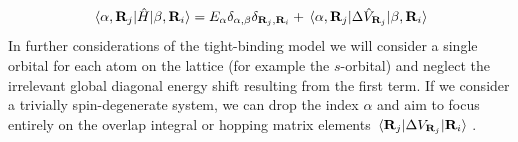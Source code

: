 \documentclass[11pt, a4paper, oneside]{book}
\theoremstyle{definition} %
\begin{document}
\begin{equation}
	\mel{\alpha, \mathbf{R}_j}{\hat{H}}{\beta, \mathbf{R}_i} = E_{\alpha} \delta_{\alpha,\beta} \delta_{\mathbf{R}_j, \mathbf{R}_i} + \mel{\alpha,\mathbf{R}_j}{\Delta \hat{V}_{\mathbf{R}_j}}{\beta, \mathbf{R}_i}
\end{equation}
In further considerations of the tight-binding model we will consider a single orbital for each atom on the lattice (for example the $s$-orbital) and neglect the irrelevant global diagonal energy shift resulting from the first term. If we consider a trivially spin-degenerate system, we can drop the index $\alpha$ and aim to focus entirely on the overlap integral or hopping matrix elements $\mel{\mathbf{R}_j}{\Delta V_{\mathbf{R}_j}}{\mathbf{R}_i}$ \cite{Manfred, Titus}.

%
%
%
 
\end{document}

